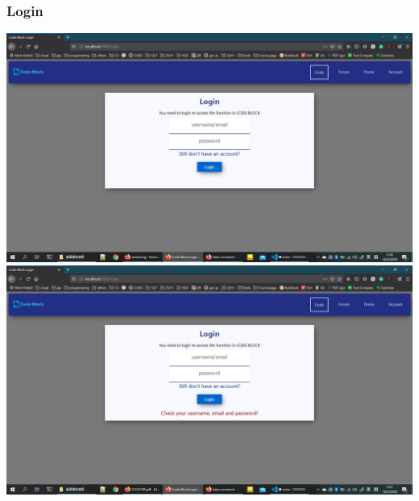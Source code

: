 \subsubsection{Login}
\includegraphics[scale=0.45]{Doc/Pics/login_no_msg.png}
\includegraphics[scale=0.45]{Doc/Pics/login_msg.png}

